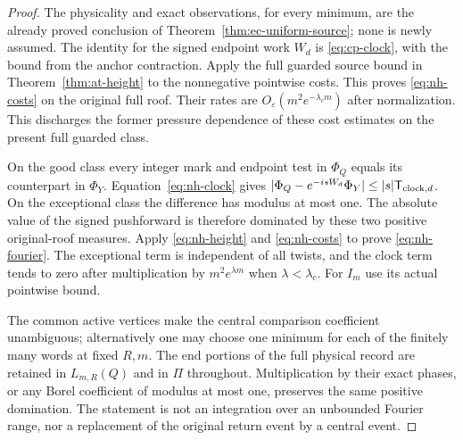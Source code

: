 \begin{proof}
The physicality and exact observations, for every minimum, are
the already proved conclusion of
Theorem~\ref{thm:ec-uniform-source}; none is newly assumed.
The identity for the signed endpoint work $W_d$ is
\eqref{eq:cp-clock}, with the bound from the anchor contraction.
Apply the full guarded source bound in
Theorem~\ref{thm:at-height} to the nonnegative pointwise costs.
This proves \eqref{eq:nh-costs} on the original full roof.
Their rates are $O_\varepsilon(m^2e^{-\lambda_cm})$ after
normalization.  This discharges the former pressure dependence
of these cost estimates on the present full guarded class.

On the good class every integer mark and endpoint test in
$\Phi_Q$ equals its counterpart in $\Phi_Y$.
Equation~\eqref{eq:nh-clock} gives
$|\Phi_Q-e^{-isW_d}\Phi_Y|
 \le |s|\mathsf T_{{\rm clock},d}$.
On the exceptional class the difference has modulus at most one.
The absolute value of the signed pushforward is therefore
dominated by these two positive original-roof measures.  Apply
\eqref{eq:nh-height} and \eqref{eq:nh-costs} to prove
\eqref{eq:nh-fourier}.  The exceptional term is independent of
all twists, and the clock term tends to zero after multiplication
by $m^2e^{\lambda m}$ when $\lambda<\lambda_c$.
For $I_m$ use its actual pointwise bound.

The common active vertices make the central comparison
coefficient unambiguous; alternatively one may choose one
minimum for each of the finitely many words at fixed $R,m$.
The end portions of the full physical record are retained in
$L_{m,R}(Q)$ and in $\Pi$ throughout.  Multiplication by their
exact phases, or any Borel coefficient of modulus at most one,
preserves the same positive domination.  The statement is not
an integration over an unbounded Fourier range, nor a
replacement of the original return event by a central event.
\end{proof}

